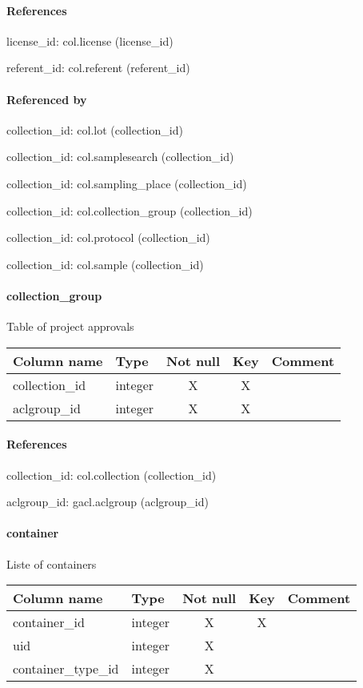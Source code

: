 \paragraph{References}
license\_id: col.license (license\_id)

referent\_id: col.referent (referent\_id)

\paragraph{Referenced by}
collection\_id: col.lot (collection\_id)

collection\_id: col.samplesearch (collection\_id)

collection\_id: col.sampling\_place (collection\_id)

collection\_id: col.collection\_group (collection\_id)

collection\_id: col.protocol (collection\_id)

collection\_id: col.sample (collection\_id)

\paragraph{collection\_group}
Table of project approvals

\begin{tabular}{|l| p{2cm}|c|c| p{5cm}|}
\hline
Column name & Type & Not null & Key & Comment \\
\hline
collection\_id & integer & X & X & \\
aclgroup\_id & integer & X & X & \\
\hline
\end{tabular}
\paragraph{References}
collection\_id: col.collection (collection\_id)

aclgroup\_id: gacl.aclgroup (aclgroup\_id)

\paragraph{container}
Liste of containers

\begin{tabular}{|l| p{2cm}|c|c| p{5cm}|}
\hline
Column name & Type & Not null & Key & Comment \\
\hline
container\_id & integer & X & X & \\
uid & integer & X &  & \\
container\_type\_id & integer & X &  & \\
\hline
\end{tabular}
